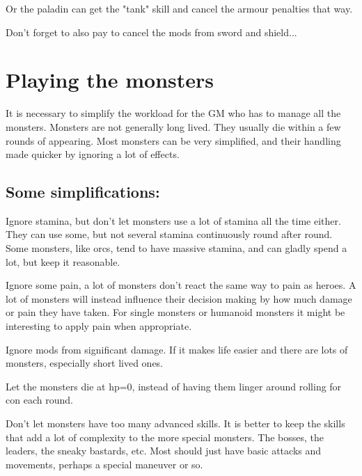 Or the paladin can get the "tank" skill and cancel the armour penalties that way.

Don't forget to also pay to cancel the mods from sword and shield...

















\section*{Playing the monsters}

It is necessary to simplify the workload for the GM who has to manage all the monsters. Monsters are not generally long lived. They usually die within a few rounds of appearing. Most monsters can be very simplified, and their handling made quicker by ignoring a lot of effects.


\subsection*{Some simplifications:}

Ignore stamina, but don't let monsters use a lot of stamina all the time either. They can use some, but not several stamina continuously round after round. Some monsters, like orcs, tend to have massive stamina, and can gladly spend a lot, but keep it reasonable.

Ignore some pain, a lot of monsters don't react the same way to pain as heroes. A lot of monsters will instead influence their decision making by how much damage or pain they have taken. For single monsters or humanoid monsters it might be interesting to apply pain when appropriate.

Ignore mods from significant damage. If it makes life easier and there are lots of monsters, especially short lived ones.

Let the monsters die at hp=0, instead of having them linger around rolling for con each round.

Don't let monsters have too many advanced skills. It is better to keep the skills that add a lot of complexity to the more special monsters. The bosses, the leaders, the sneaky bastards, etc. Most should just have basic attacks and movements, perhaps a special maneuver or so.


